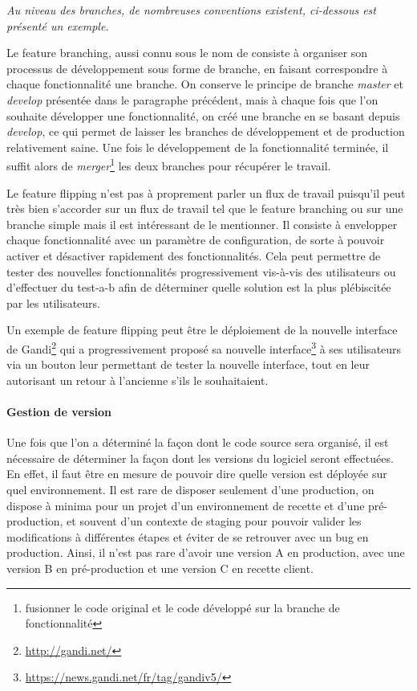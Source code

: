 \emph{Au niveau des branches, de nombreuses conventions existent, ci-dessous est présenté un exemple.}

Le feature branching, aussi connu sous le nom de  consiste à organiser son processus de développement sous forme de branche, en faisant correspondre à chaque fonctionnalité une branche. On conserve le principe de branche \emph{master} et \emph{develop} présentée dans le paragraphe précédent, mais à chaque fois que l'on souhaite développer une fonctionnalité, on créé une branche en se basant depuis \emph{develop}, ce qui permet de laisser les branches de développement et de production relativement saine. Une fois le développement de la fonctionnalité terminée, il suffit alors de \emph{merger}\footnote{fusionner le code original et le code développé sur la branche de fonctionnalité} les deux branches pour récupérer le travail.


Le feature flipping n'est pas à proprement parler un flux de travail puisqu'il peut très bien s'accorder sur un flux de travail tel que le feature branching ou sur une branche simple mais il est intéressant de le mentionner. Il consiste à envelopper chaque fonctionnalité avec un paramètre de configuration, de sorte à pouvoir activer et désactiver rapidement des fonctionnalités. Cela peut permettre de tester des nouvelles fonctionnalités progressivement vis-à-vis des utilisateurs ou d'effectuer du \gls{test-a-b} afin de déterminer quelle solution est la plus plébiscitée par les utilisateurs. 

Un exemple de feature flipping peut être le déploiement de la nouvelle interface de Gandi\footnote{\url{http://gandi.net/}} qui a progressivement proposé sa nouvelle interface\footnote{\url{https://news.gandi.net/fr/tag/gandiv5/}} à ses utilisateurs via un bouton leur permettant de tester la nouvelle interface, tout en leur autorisant un retour à l'ancienne s'ils le souhaitaient. 

\paragraph{Gestion de version}

Une fois que l'on a déterminé la façon dont le code source sera organisé, il est nécessaire de déterminer la façon dont les versions du logiciel seront effectuées. En effet, il faut être en mesure de pouvoir dire quelle version est déployée sur quel environnement. Il est rare de disposer seulement d'une production, on dispose à minima pour un projet d'un environnement de recette et d'une pré-production, et souvent d'un contexte de staging pour pouvoir valider les modifications à différentes étapes et éviter de se retrouver avec un bug en production. Ainsi, il n'est pas rare d'avoir une version A en production, avec une version B en pré-production et une version C en recette client.

